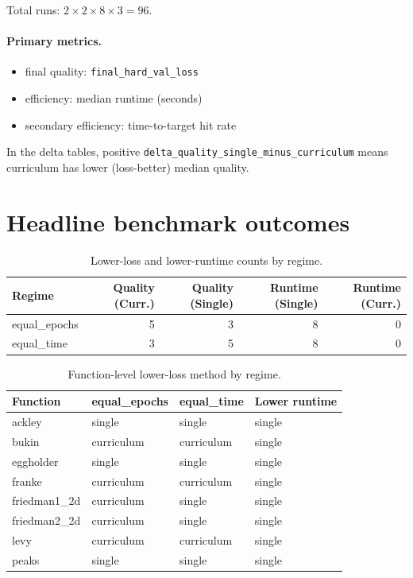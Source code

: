 Total runs: \(2 \times 2 \times 8 \times 3 = 96\).

\paragraph{Primary metrics.}

\begin{itemize}
    \item final quality: \texttt{final\_hard\_val\_loss}
    \item efficiency: median runtime (seconds)
    \item secondary efficiency: time-to-target hit rate
\end{itemize}

In the delta tables, positive
\texttt{delta\_quality\_single\_minus\_curriculum} means curriculum has lower
(loss-better) median quality.

\section{Headline benchmark outcomes}

\begin{table}[h]
\centering
\small
\begin{tabular}{lrrrr}
\toprule
Regime & Quality (Curr.) & Quality (Single) & Runtime (Single) & Runtime (Curr.) \\
\midrule
equal\_epochs & 5 & 3 & 8 & 0 \\
equal\_time & 3 & 5 & 8 & 0 \\
\bottomrule
\end{tabular}
\caption{Lower-loss and lower-runtime counts by regime.}
\label{tab:curr-vs-single-counts}
\end{table}

\begin{table}[h]
\centering
\small
\begin{tabular}{llll}
\toprule
Function & equal\_epochs & equal\_time & Lower runtime \\
\midrule
ackley & single & single & single \\
bukin & curriculum & curriculum & single \\
eggholder & single & single & single \\
franke & curriculum & curriculum & single \\
friedman1\_2d & curriculum & single & single \\
friedman2\_2d & curriculum & single & single \\
levy & curriculum & curriculum & single \\
peaks & single & single & single \\
\bottomrule
\end{tabular}
\caption{Function-level lower-loss method by regime.}
\label{tab:curr-vs-single-function-counts}
\end{table}

